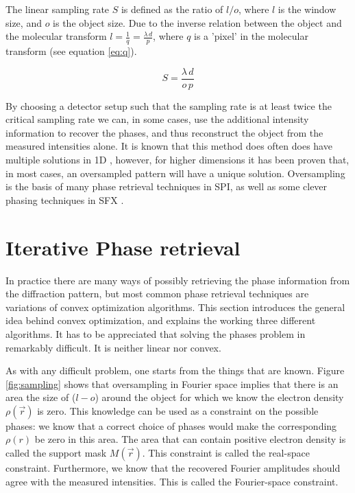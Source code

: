 The linear sampling rate $S$ is defined as the ratio of $l/o$, where $l$ is the window size, and $o$ is the object size. Due to the inverse relation between the object and the molecular transform $l = \frac{1}{q} = \frac{\lambda\, d}{p}$, where $q$ is a 'pixel' in the molecular transform (see equation \ref{eq:q}). 

\begin{equation}
S = \frac{\lambda\,d}{o\,p}
\end{equation}

By choosing a detector setup such that the sampling rate is at least twice the critical sampling rate we can, in some cases, use the additional intensity information to recover the phases, and thus reconstruct the object from the measured intensities alone. It is known that this method does often does have multiple solutions in 1D \cite{Walther1963}, however, for higher dimensions it has been proven that, in most cases, an oversampled pattern will have a unique solution\cite{Bruck1979}. Oversampling is the basis of many phase retrieval techniques in SPI, as well as some clever phasing techniques in SFX \cite{Ayyer2016,Chapman2011}.

\section{Iterative Phase retrieval}
In practice there are many ways of possibly retrieving the phase information from the diffraction pattern, but most common phase retrieval techniques are variations of convex optimization algorithms. This section introduces the general idea behind convex optimization, and explains the working three different algorithms. It has to be appreciated that solving the phases problem in remarkably difficult. It is neither linear nor convex.

As with any difficult problem, one starts from the things that are known. Figure \ref{fig:sampling} shows that oversampling in Fourier space implies that there is an area the size of ($l-o$) around the object for which we know the electron density $\rho(\vec{r})$ is zero. This knowledge can be used as a constraint on the possible phases: we know that a correct choice of phases would make the corresponding $\rho(r)$ be zero in this area. The area that can contain positive electron density is called the support mask $M(\vec{r})$. This constraint is called the real-space constraint. Furthermore, we know that the recovered Fourier amplitudes should agree with the measured intensities. This is called the Fourier-space constraint. 

